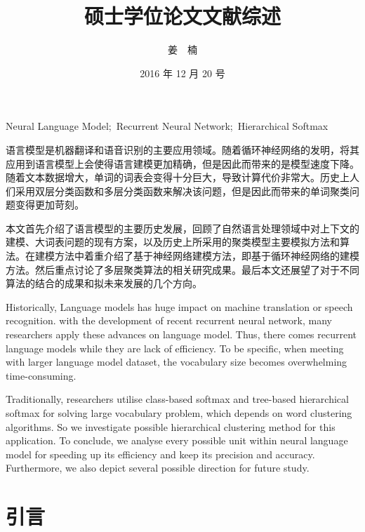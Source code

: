 \documentclass[12pt,a4paper]{article}
\title{硕士学位论文文献综述}
\author{姜~~楠}
\date{2016 年 12 月 20 号}
\begin{document}
\maketitle



{Neural Language Model;\ Recurrent Neural Network;\ Hierarchical Softmax}

\begin{abstract_ch}
语言模型是机器翻译和语音识别的主要应用领域。随着循环神经网络的发明，将其应用到语言模型上会使得语言建模更加精确，但是因此而带来的是模型速度下降。随着文本数据增大，单词的词表会变得十分巨大，导致计算代价非常大。历史上人们采用双层分类函数和多层分类函数来解决该问题，但是因此而带来的单词聚类问题变得更加苛刻。

本文首先介绍了语言模型的主要历史发展，回顾了自然语言处理领域中对上下文的建模、大词表问题的现有方案，以及历史上所采用的聚类模型主要模拟方法和算法。在建模方法中着重介绍了基于神经网络建模方法，即基于循环神经网络的建模方法。然后重点讨论了多层聚类算法的相关研究成果。最后本文还展望了对于不同算法的结合的成果和拟未来发展的几个方向。
\end{abstract_ch}
\newpage
\begin{abstract_en}
Historically, Language models has huge impact on machine translation or speech recognition. with the development of recent recurrent neural network, many researchers apply these advances on language model. Thus, there comes recurrent language models while they are lack of efficiency.  To be specific, when meeting with larger language model dataset, the vocabulary size becomes overwhelming time-consuming.

Traditionally, researchers utilise class-based softmax and tree-based hierarchical softmax for solving large vocabulary problem, which depends on word clustering algorithms. So we investigate possible hierarchical clustering method for this application.  To conclude, we analyse every possible unit within neural language model for speeding up its efficiency and keep its precision and accuracy. Furthermore, we also depict several possible direction for future study.

\end{abstract_en}
\newpage
\tableofcontents
\newpage

\section{引言}
\end{document}
